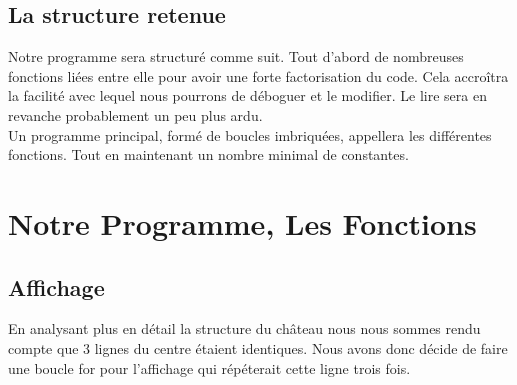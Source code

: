\documentclass[titlepage]{report}
\begin{document}
\subsection{La structure retenue}
\hspace*{0.5cm}Notre programme sera structuré comme suit. Tout d'abord de nombreuses fonctions   liées entre elle pour avoir une forte factorisation du code. Cela accroîtra la facilité avec lequel nous pourrons de déboguer et le modifier. Le lire sera en revanche probablement un peu plus ardu.\\
\hspace*{0.5cm}Un programme principal, formé de boucles imbriquées, appellera  les différentes fonctions. Tout en maintenant un nombre minimal de constantes.


\section{Notre Programme, Les Fonctions}
\subsection{Affichage}

\hspace*{0.5cm} En analysant plus en détail la structure du château nous nous sommes rendu compte que 3 lignes du centre étaient identiques. Nous avons donc décide de faire une boucle for pour l'affichage qui répéterait cette ligne trois fois.\\
\begin{figure}[H]
    \centering
\end{figure}
\vspace*{2.5cm}
\end{document}

